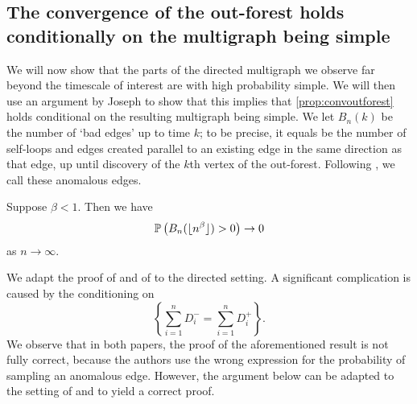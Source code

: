 \subsection{The convergence of the out-forest holds conditionally on the multigraph being simple}
We will now show that the parts of the directed multigraph we observe far beyond the timescale of interest are with high probability simple. We will then use an argument by Joseph \cite{josephComponentSizesCritical2014} to show that this implies that \cref{prop:convoutforest} holds conditional on the resulting multigraph being simple. We let $B_n(k)$ be the number of `bad edges' up to time $k$; to be precise, it equals be the number of self-loops and edges created parallel to an existing edge in the same direction as that edge, up until discovery of the $k$th vertex of the out-forest. Following \cite{conchon--kerjanStableGraphMetric2020}, we call these anomalous edges. 
\begin{proposition}\label{prop.anomalousedges}
Suppose $\beta<1$. Then we have
$$\P\left(B_n(\lfloor n^\beta \rfloor)>0\right)\to 0$$
as $n\to \infty$.
\end{proposition}
\begin{remark}
We adapt the proof of \cite[Lemma 7.1]{josephComponentSizesCritical2014} and of \cite[Proposition 5.3]{conchon--kerjanStableGraphMetric2020} to the directed setting. A significant complication is caused by the conditioning on $$\left\{\sum_{i=1}^n D^-_i=\sum_{i=1}^n D^+_i\right\}.$$ We observe that in both papers, the proof of the aforementioned result is not fully correct, because the authors use the wrong expression for the probability of sampling an anomalous edge. However, the argument below can be adapted to the setting of \cite{josephComponentSizesCritical2014} and \cite{conchon--kerjanStableGraphMetric2020} to yield a correct proof.
\end{remark}
